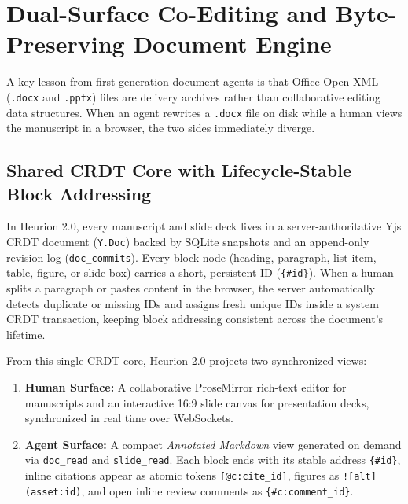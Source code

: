 \documentclass[11pt,a4paper]{article}
\begin{document}
\section{Dual-Surface Co-Editing and Byte-Preserving Document Engine}
\label{sec:dualsurface}

A key lesson from first-generation document agents is that Office Open XML (\texttt{.docx} and \texttt{.pptx}) files are delivery archives rather than collaborative editing data structures. When an agent rewrites a \texttt{.docx} file on disk while a human views the manuscript in a browser, the two sides immediately diverge.

\subsection{Shared CRDT Core with Lifecycle-Stable Block Addressing}
In Heurion 2.0, every manuscript and slide deck lives in a server-authoritative Yjs CRDT document (\texttt{Y.Doc}) backed by SQLite snapshots and an append-only revision log (\texttt{doc\_commits}). Every block node (heading, paragraph, list item, table, figure, or slide box) carries a short, persistent ID (\texttt{\{\#id\}}). When a human splits a paragraph or pastes content in the browser, the server automatically detects duplicate or missing IDs and assigns fresh unique IDs inside a system CRDT transaction, keeping block addressing consistent across the document's lifetime.

From this single CRDT core, Heurion 2.0 projects two synchronized views:
\begin{enumerate}[leftmargin=1.5em,itemsep=2pt]
  \item \textbf{Human Surface:} A collaborative ProseMirror rich-text editor for manuscripts and an interactive 16:9 slide canvas for presentation decks, synchronized in real time over WebSockets.
  \item \textbf{Agent Surface:} A compact \emph{Annotated Markdown} view generated on demand via \texttt{doc\_read} and \texttt{slide\_read}. Each block ends with its stable address \texttt{\{\#id\}}, inline citations appear as atomic tokens \texttt{[@c:cite\_id]}, figures as \texttt{![alt](asset:id)}, and open inline review comments as \texttt{\{\#c:comment\_id\}}.
\end{enumerate}
\end{document}
